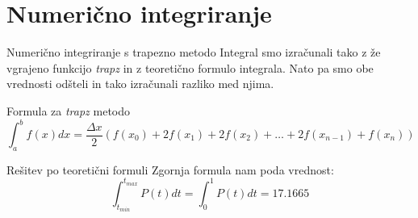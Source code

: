 \documentclass[11pt, aspectration=169]{beamer}
\begin{document}
\section{Numerično integriranje}
\begin{frame}{Numerično integriranje s trapezno metodo}
Integral smo izračunali tako z že vgrajeno funkcijo \textit{trapz} in z teoretično formulo integrala. Nato pa smo obe vrednosti odšteli in tako izračunali razliko med njima.
\begin{block}{Formula za \textit{trapz} metodo}
\small
\[
\int_{a}^{b} f(x) dx = \frac{\Delta x}{2} \left( f(x_0) + 2f(x_1) + 2f(x_2) + \dots + 2f(x_{n-1}) + f(x_n) \right)
\]
\end{block}
\begin{block}{Rešitev po teoretični formuli}
Zgornja formula nam poda vrednost: 
\[
\int_{t_{min}}^{t_{max}} P(t) dt = \int_{0}^{1} P(t) dt = 17.1665
\]
\end{block}

\end{frame}
\end{document}
